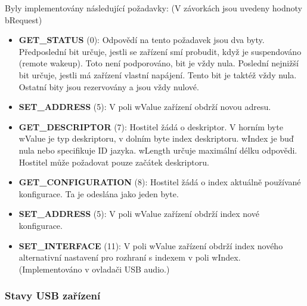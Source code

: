 Byly implementovány následující požadavky: (V závorkách jsou uvedeny hodnoty bRequest)
\begin{itemize}

\item \textbf{GET\_STATUS} (0): Odpovědí na tento požadavek jsou dva byty. Předposlední bit určuje, jestli se zařízení smí probudit, když je suspendováno (remote wakeup). Toto není podporováno, bit je vždy nula. Poslední nejnižší bit určuje, jestli má zařízení vlastní napájení. Tento bit je taktéž vždy nula. Ostatní bity jsou rezervovány a jsou vždy nulové.

\item \textbf{SET\_ADDRESS} (5): V poli wValue zařízení obdrží novou adresu.

\item \textbf{GET\_DESCRIPTOR} (7): Hostitel žádá o deskriptor. V horním byte wValue je typ deskriptoru, v dolním byte index deskriptoru. wIndex je buď nula nebo specifikuje ID jazyka. wLength určuje maximální délku odpovědi. Hostitel může požadovat pouze začátek deskriptoru.

\item \textbf{GET\_CONFIGURATION} (8): Hostitel žádá o index aktuálně používané konfigurace. Ta je odeslána jako jeden byte.

\item \textbf{SET\_ADDRESS} (5): V poli wValue zařízení obdrží index nové konfigurace.

\item \textbf{SET\_INTERFACE} (11): V poli wValue zařízení obdrží index nového alternativní nastavení pro rozhraní s indexem v poli wIndex. (Implementováno v ovladači USB audio.)

\end{itemize}

\subsubsection{Stavy USB zařízení}
\label{subsubsec:usb-states}

